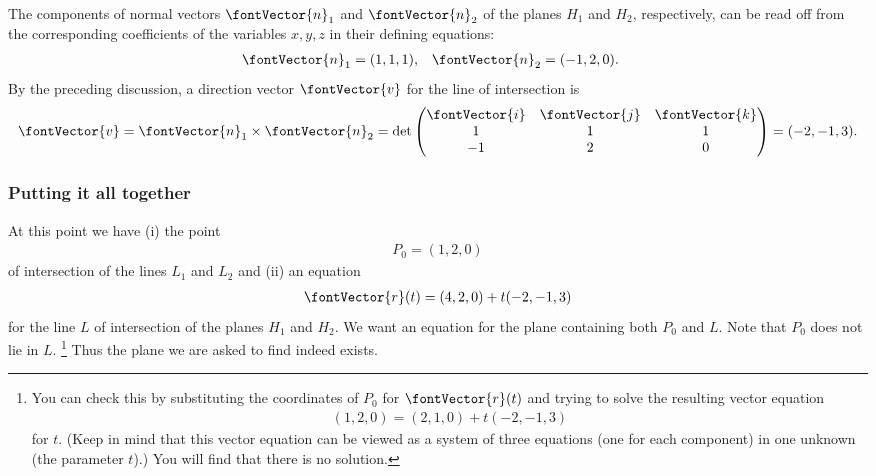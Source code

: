 {The components of normal vectors $\fontVector{n}_{1}$ and $\fontVector{n}_{2}$ of the planes $H_{1}$ and $H_{2}$, respectively, can be read off from the corresponding coefficients of the variables $x,y,z$ in their defining equations:
\begin{align*}
\fontVector{n}_{1}
&=
(1,1,1),
&
\fontVector{n}_{2}
&=
(-1,2,0).
\end{align*}
By the preceding discussion, a direction vector $\fontVector{v}$ for the line of intersection is
\begin{align*}
\fontVector{v}
=
\fontVector{n}_{1} \times \fontVector{n}_{2}
=
\det
\begin{pmatrix}
\fontVector{i}	&	\fontVector{j}	&	\fontVector{k}	\\
1			&	1			&	1			\\
-1			&	2			&	0
\end{pmatrix}
=
(-2,-1,3).
\end{align*}



\subsubsection{Putting it all together}

At this point we have (i) the point
\begin{align*}
P_{0}
=
(1,2,0)
\end{align*}
of intersection of the lines $L_{1}$ and $L_{2}$ and (ii) an equation
\begin{align*}
\fontVector{r}(t)
=
(4,2,0) + t (-2,-1,3)
\end{align*}
for the line $L$ of intersection of the planes $H_{1}$ and $H_{2}$. We want an equation for the plane containing both $P_{0}$ and $L$. Note that $P_{0}$ does not lie in $L$.%
\footnote{You can check this by substituting the coordinates of $P_{0}$ for $\fontVector{r}(t)$ and trying to solve the resulting vector equation
\begin{align*}
(1,2,0)
=
(2,1,0) + t (-2,-1,3)
\end{align*}
for $t$. (Keep in mind that this vector equation can be viewed as a system of three equations (one for each component) in one unknown (the parameter $t$).) You will find that there is no solution.} %
Thus the plane we are asked to find indeed exists.

}

